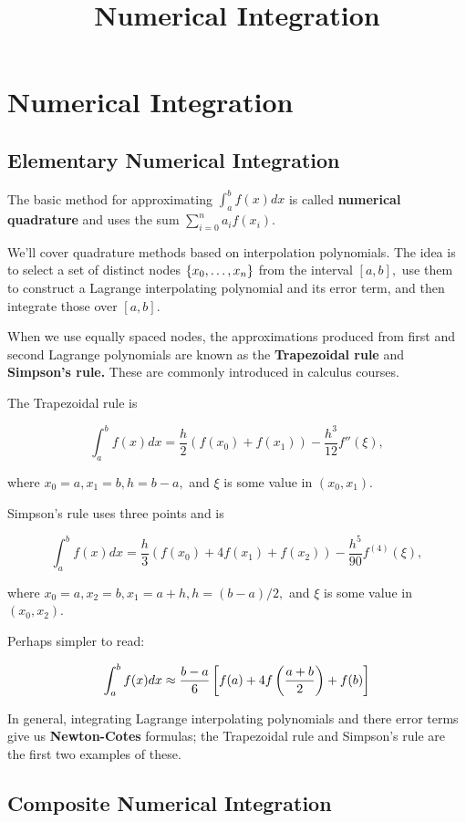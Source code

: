\documentclass{article}
\title{Numerical Integration}
\begin{document}
\section{Numerical Integration}

\subsection{Elementary Numerical Integration}

The basic method for approximating $\int_a^{b} f(x) dx$ is called \textbf{numerical quadrature} and uses the sum $\sum_{i=0}^n a_i f(x_i).$

We'll cover quadrature methods based on interpolation polynomials. The idea is to select a set of distinct nodes $\left\{ x_0, \dots, x_n \right\}$ from the \@{interval} $[a, b],$ use them to construct a Lagrange interpolating polynomial and its error term, and then integrate those over $[a,b].$

When we use equally spaced nodes, the approximations produced from first and second Lagrange polynomials are known as the \textbf{Trapezoidal rule} and \textbf{Simpson's rule.} These are commonly introduced in calculus courses.

The Trapezoidal rule is

\[ \int_a^b f(x) dx = \frac{h}{2}(f(x_0) + f(x_1)) - \frac{h^3}{12}f''(\xi), \]

where $x_0 = a, x_1 = b, h = b - a,$ and $\xi$ is some value in $(x_0, x_1).$

Simpson's rule uses three points and is

\[ \int_{a}^{b} f(x) dx = \frac{h}{3}(f(x_0) + 4 f(x_1) + f(x_2)) - \frac{h^5}{90}f^{(4)}(\xi), \]

where $x_0 = a, x_2 = b, x_1 = a + h, h = (b - a)/2,$ and $\xi$ is some value in $(x_0, x_2).$

Perhaps simpler to read:

\[ \int_{a}^{b} f(x) dx \approx \frac{b - a}{6} \left[f(a) + 4 f \left(\frac{a + b}{2}\right) + f(b)\right] \]

In general, integrating Lagrange interpolating polynomials and there error terms give us \textbf{Newton-Cotes} formulas; the Trapezoidal rule and Simpson's rule are the first two examples of these.

\subsection{Composite Numerical Integration}
\end{document}
